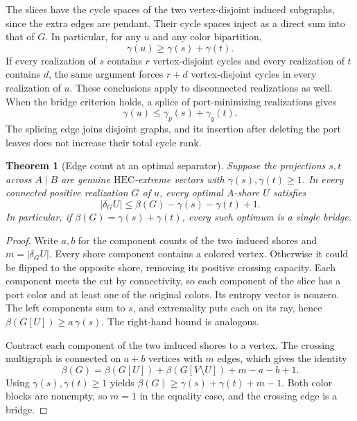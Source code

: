\documentclass[11pt]{article}
\newtheorem{theorem}{Theorem}[section]
\newcommand{\HEC}{\mathrm{HEC}}
\begin{document}
The slices have the cycle spaces of the two vertex-disjoint induced
subgraphs, since the extra edges are pendant. Their cycle spaces inject
as a direct sum into that of \(G\). In particular, for any \(u\) and
any color bipartition,
\begin{equation}
 \gamma(u)\geq\gamma(s)+\gamma(t).
 \label{eq:lower}
\end{equation}
If every realization of \(s\) contains \(r\) vertex-disjoint cycles and
every realization of \(t\) contains \(d\), the same argument forces
\(r+d\) vertex-disjoint cycles in every realization of \(u\). These
conclusions apply to disconnected realizations as well. When the
bridge criterion holds, a splice of port-minimizing realizations gives
\begin{equation}
 \gamma(u)\leq\gamma_p(s)+\gamma_q(t).
 \label{eq:upper}
\end{equation}
The splicing edge joins disjoint graphs, and its insertion after deleting
the port leaves does not increase their total cycle rank.

\begin{theorem}[Edge count at an optimal separator]
\label{thm:seam}
Suppose the projections \(s,t\) across \(A\mid B\) are genuine
\(\HEC\)-extreme vectors with \(\gamma(s),\gamma(t)\geq 1\).
In every connected positive realization \(G\) of \(u\), every optimal
\(A\)-shore \(U\) satisfies
\begin{equation}
 |\delta_G U|\leq \beta(G)-\gamma(s)-\gamma(t)+1.
 \label{eq:excess}
\end{equation}
In particular, if \(\beta(G)=\gamma(s)+\gamma(t)\), every such optimum
is a single bridge.
\end{theorem}

\begin{proof}
Write \(a,b\) for the component counts of the two induced shores and
\(m=|\delta_G U|\). Every shore component contains a colored vertex.
Otherwise it could be flipped to the opposite shore, removing its
positive crossing capacity. Each component meets the cut by connectivity,
so each component of the slice has a port color and at least one of the
original colors. Its entropy vector is nonzero. The left components
sum to \(s\), and extremality puts each on its ray, hence
\(\beta(G[U])\geq a\,\gamma(s)\). The right-hand bound is analogous.

Contract each component of the two induced shores to a vertex. The
crossing multigraph is connected on \(a+b\) vertices with \(m\) edges,
which gives the identity
\[
 \beta(G)=\beta(G[U])+\beta(G[V\setminus U])+m-a-b+1.
\]
Using \(\gamma(s),\gamma(t)\geq1\) yields
\(\beta(G)\geq\gamma(s)+\gamma(t)+m-1\). Both color blocks are nonempty,
so \(m=1\) in the equality case, and the crossing edge is a bridge.
\end{proof}
\end{document}
